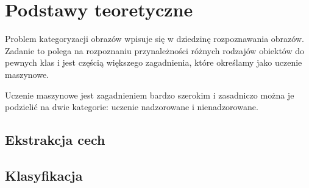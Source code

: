 \chapter{Podstawy teoretyczne}

Problem kategoryzacji obrazów wpisuje się w dziedzinę rozpoznawania obrazów. Zadanie to polega na rozpoznaniu przynależności różnych rodzajów obiektów do pewnych klas i jest częścią większego zagadnienia, które określamy jako uczenie maszynowe.


Uczenie maszynowe jest zagadnieniem bardzo szerokim i zasadniczo można je podzielić na dwie kategorie: uczenie nadzorowane i nienadzorowane. 



\section{Ekstrakcja cech}

\section{Klasyfikacja}
